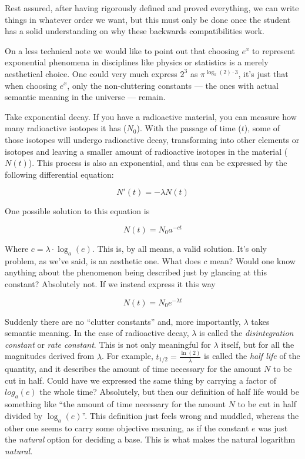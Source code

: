 Rest assured, after having rigorously defined and proved everything, we can write things in whatever order we want, but this must only be done once the student has a solid understanding on why these backwards compatibilities work.

On a less technical note we would like to point out that choosing $e^x$ to represent exponential phenomena in disciplines like physics or statistics is a merely aesthetical choice. One could very much express $2^3$ as $\pi^{\log_{\pi}(2)\cdot 3}$, it's just that when choosing $e^x$, only the non-cluttering constants --- the ones with actual semantic meaning in the universe --- remain.

\newpage

Take exponential decay. If you have a radioactive material, you can measure how many radioactive isotopes it has ($N_0$). With the passage of time ($t$), some of those isotopes will undergo radioactive decay, transforming into other elements or isotopes and leaving a smaller amount of radioactive isotopes in the material ($N(t)$). This process is also an exponential, and thus can be expressed by the following differential equation:

$$N'(t) = -\lambda N(t)$$

One possible solution to this equation is

$$N(t) = N_0 a^{-ct}$$

Where $c = \lambda \cdot \log_a(e)$. This is, by all means, a valid solution. It's only problem, as we've said, is an aesthetic one. What does $c$ mean? Would one know anything about the phenomenon being described just by glancing at this constant? Absolutely not. If we instead express it this way

$$N(t) = N_0 e^{-\lambda t}$$

Suddenly there are no \enquote{clutter constants} and, more importantly, $\lambda$ takes semantic meaning. In the case of radioactive decay, $\lambda$ is called the \textit{disintegration constant} or \textit{rate constant}. This is not only meaningful for $\lambda$ itself, but for all the magnitudes derived from $\lambda$. For example, $t_{1/2} = \frac{\ln(2)}{\lambda}$ is called the \textit{half life} of the quantity, and it describes the amount of time necessary for the amount $N$ to be cut in half. Could have we expressed the same thing by carrying a factor of $log_a(e)$ the whole time? Absolutely, but then our definition of half life would be something like \enquote{the amount of time necessary for the amount $N$ to be cut in half divided by $\log_a(e)$}. This definition just feels wrong and muddled, whereas the other one seems to carry some objective meaning, as if the constant $e$ was just the \textit{natural} option for deciding a base. This is what makes the natural logarithm \textit{natural}.

